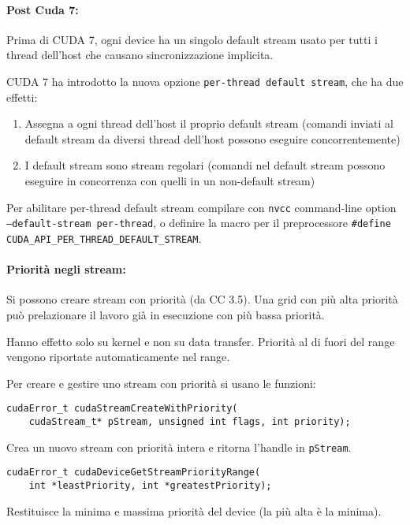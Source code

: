 \paragraph{Post Cuda 7:} Prima di CUDA 7, ogni device ha un singolo default stream usato per tutti i thread dell'host che causano sincronizzazione implicita. 

CUDA 7 ha introdotto la nuova opzione \texttt{per-thread default stream}, che ha due effetti:
\begin{enumerate}
	\item Assegna a ogni thread dell'host il proprio default stream (comandi inviati al default stream da diversi thread dell'host possono eseguire concorrentemente)
	
	\item I default stream sono stream regolari (comandi nel default stream possono eseguire in concorrenza con quelli in un non-default stream)
\end{enumerate}

Per abilitare per-thread default stream compilare con \texttt{nvcc} command-line option \texttt{--default-stream per-thread}, o definire la macro per il preprocessore \texttt{\#define CUDA\_API\_PER\_THREAD\_DEFAULT\_STREAM}.\\

\paragraph{Priorità negli stream:} Si possono creare stream con priorità (da CC 3.5). Una grid con più alta priorità può prelazionare il lavoro già in esecuzione con più bassa priorità. 

Hanno effetto solo su kernel e non su data transfer. Priorità al di fuori del range vengono riportate automaticamente nel range.

Per creare e gestire uno stream con priorità si usano le funzioni:
\begin{verbatim}
cudaError_t cudaStreamCreateWithPriority(
	cudaStream_t* pStream, unsigned int flags, int priority);
\end{verbatim}

Crea un nuovo stream con priorità intera e ritorna l'handle in \texttt{pStream}.

\begin{verbatim}
cudaError_t cudaDeviceGetStreamPriorityRange(
	int *leastPriority, int *greatestPriority);
\end{verbatim}

Restituisce la minima e massima priorità del device (la più alta è la minima).

